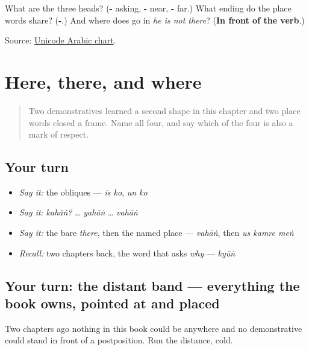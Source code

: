\begin{tcolorbox}[breakable,colback=teal!4,colframe=teal!35!black,title={Before you move on}]
What are the three heads? (\textbf{-} asking, \textbf{-} near, \textbf{-} far.) What ending do the place words share? (\textbf{-}.) And where does \textbf{} go in \emph{he is not there}? (\textbf{In front of the verb}.)

Source: \href{https://www.unicode.org/charts/PDF/U0600.pdf}{Unicode Arabic chart}.
\end{tcolorbox}
\section[\texorpdfstring{\ur{اس} · \ur{ان} · \ur{یہاں} … (is · un · yahāṅ …)}{اس · ان · یہاں … (is · un · yahāṅ …)}]{Here, there, and where}

\label{lesson:UR-R24-here-there-where}



\begin{quote}
Two demonstratives learned a second shape in this chapter and two place words closed a frame. Name all four, and say which of the four is also a mark of respect.
\end{quote}

\subsection*{Your turn}
\begin{itemize}
\raggedright
  \item \emph{Say it:} the obliques — \emph{is ko}, \emph{un ko}
  \item \emph{Say it:} \emph{kahāṅ?} … \emph{yahāṅ} … \emph{vahāṅ}
  \item \emph{Say it:} the bare \emph{there}, then the named place — \emph{vahāṅ}, then \emph{us kamre meṅ}
  \item \emph{Recall:} two chapters back, the word that asks \emph{why} — \emph{kyūṅ}
\end{itemize}

\subsection*{Your turn: the distant band — everything the book owns, pointed at and placed}
Two chapters ago nothing in this book could be anywhere and no demonstrative could stand in front of a postposition. Run the distance, cold.

